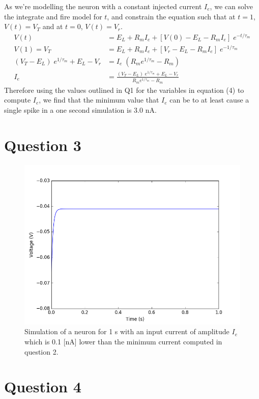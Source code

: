\documentclass[12pt, a4paper]{article}
\begin{document}
As we're modelling the neuron with a constant injected current $I_e$, we can solve the integrate and fire model for $t$, and constrain the equation such that at $t=1$, $V(t)=V_T$ and at $t=0$, $V(t) = V_r$.
\begin{align}
  V(t) &= E_L + R_m I_e + [V(0) - E_L - R_m I_e]\; e^{-t/\tau_m}\\
  V(1) = V_T &= E_L + R_m I_e + [V_r - E_L - R_m I_e]\; e^{-1/\tau_m}\\
  (V_T - E_L)\; e^{1/\tau_m} + E_L - V_r &= I_e\; (R_m e^{1/\tau_m} - R_m)\\
  I_e &= \frac{(V_T - E_L)\; e^{1/\tau_m} + E_L - V_r}{R_m e^{1/\tau_m} - R_m}
\end{align}
Therefore using the values outlined in Q1 for the variables in equation (4) to compute $I_e$, we find that the minimum value that $I_e$ can be to at least cause a single spike in a one second simulation is 3.0 nA.

\section*{Question 3}

\begin{figure}[H]
  \centering
  \includegraphics[width=1\linewidth]{figures/q3}
  \caption{Simulation of a neuron for 1 s with an input current of amplitude $I_e$ which is 0.1 [nA] lower than the minimum current computed in question 2.}
\end{figure}

\section*{Question 4}
\end{document}
